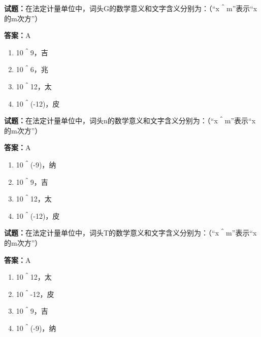 \documentclass{ctexbook}
\begin{document}




\vspace{1em}

\textbf{试题：}在法定计量单位中，词头G的数学意义和文字含义分别为：（“x＾m”表示“x的m次方”） 

\textbf{答案：}A 

\begin{enumerate}[leftmargin=3em]
  \item 10＾9，吉 

  \item 10＾6，兆 

  \item 10＾12，太 

  \item 10＾(-12)，皮 

\end{enumerate}





\vspace{1em}

\textbf{试题：}在法定计量单位中，词头n的数学意义和文字含义分别为：（“x＾m”表示“x的m次方”） 

\textbf{答案：}A 

\begin{enumerate}[leftmargin=3em]
  \item 10＾(-9)，纳 

  \item 10＾9，吉 

  \item 10＾12，太 

  \item 10＾(-12)，皮 

\end{enumerate}






\vspace{1em}

\textbf{试题：}在法定计量单位中，词头T的数学意义和文字含义分别为：（“x＾m”表示“x的m次方”） 

\textbf{答案：}A 

\begin{enumerate}[leftmargin=3em]
  \item 10＾12，太 

  \item 10＾-12，皮 

  \item 10＾9，吉 

  \item 10＾(-9)，纳 

\end{enumerate}
\end{document}
